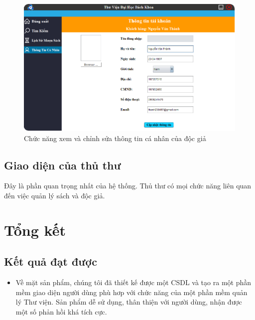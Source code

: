 \documentclass[12pt]{report}
\begin{document}
						\begin{figure}
						\centering
						\includegraphics[scale=0.65]{images/inforreader.png}
						\caption{Chức năng xem và chỉnh sửa thông tin cá nhân của độc giả}
						\label{fig:readerinfor}
						\end{figure}
			\section{Giao diện của thủ thư}
			Đây là phần quan trọng nhất của hệ thống. Thủ thư có mọi chức năng liên quan đến việc quản lý sách và độc giả. 
	\chapter{Tổng kết}
		\section{Kết quả đạt được}
			\begin{itemize}
				\item Về mặt sản phẩm, chúng tôi đã thiết kế được một CSDL và tạo ra một phần mềm giao diện người dùng phù hơp với chức năng của một phần mềm quản lý Thư viện. Sản phẩm dễ sử dụng, thân thiện với người dùng, nhận được một số phản hồi khá tích cực.
			\end{itemize}
\end{document}
